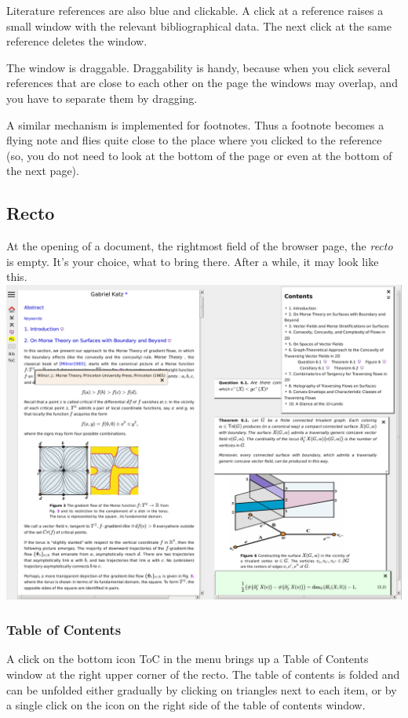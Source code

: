 \documentclass{article}
\begin{document}
Literature references are also blue and clickable. A click at a reference 
raises a small window with the relevant bibliographical data. 
The next click at the
same reference deletes the window. 

The window is
draggable. Draggability is handy, because when you click several 
references that are close to each other on the page the windows may
overlap, and you have to separate them by dragging.

A similar mechanism is implemented for footnotes. Thus a footnote becomes
a flying note and flies quite close to the place where you
clicked to the reference (so, you do not need to look at the bottom of the 
page or even at the bottom of the next page).

\subsection{Recto}\label{s1.3}
At the opening of a document, the rightmost field of the browser page, the
{\em recto\/} is empty. It's your choice, what to bring there. After a
while, it may look like this.\newline
\includegraphics[width=600px]{figs/page-2.png}


\subsubsection{Table of Contents}\label{s1.3.1} 
A click on the bottom icon ToC in the menu brings up a Table of Contents
window at the right upper corner of the recto. The table of contents is 
folded and can be unfolded either gradually by clicking on triangles
 next to each item,  
or by a single click on the icon   
on the right side of the table of contents window.
\end{document}
